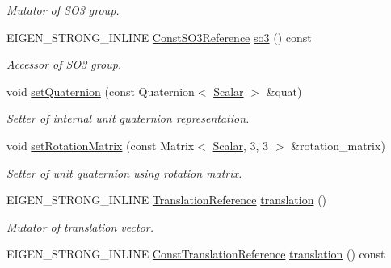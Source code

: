 \begin{DoxyCompactItemize}
\begin{DoxyCompactList}\small\item\em Mutator of S\+O3 group. \end{DoxyCompactList}\item 
E\+I\+G\+E\+N\+\_\+\+S\+T\+R\+O\+N\+G\+\_\+\+I\+N\+L\+I\+NE \hyperlink{class_sophus_1_1_s_e3_group_base_ad2e613f34fbfff912b6b0ccf1fb5f987}{Const\+S\+O3\+Reference} \hyperlink{class_sophus_1_1_s_e3_group_base_a04ef4ad388a72dbbbd97bb6fa893d468}{so3} () const \hypertarget{class_sophus_1_1_s_e3_group_base_a04ef4ad388a72dbbbd97bb6fa893d468}{}\label{class_sophus_1_1_s_e3_group_base_a04ef4ad388a72dbbbd97bb6fa893d468}

\begin{DoxyCompactList}\small\item\em Accessor of S\+O3 group. \end{DoxyCompactList}\item 
void \hyperlink{class_sophus_1_1_s_e3_group_base_a20989a37e6346b012f16ff545d808751}{set\+Quaternion} (const Quaternion$<$ \hyperlink{class_sophus_1_1_s_e3_group_base_aa3db86a2cabe32d3c299dda41af181cc}{Scalar} $>$ \&quat)
\begin{DoxyCompactList}\small\item\em Setter of internal unit quaternion representation. \end{DoxyCompactList}\item 
void \hyperlink{class_sophus_1_1_s_e3_group_base_a8cd9978eb14b416efd6cbb6664900d4d}{set\+Rotation\+Matrix} (const Matrix$<$ \hyperlink{class_sophus_1_1_s_e3_group_base_aa3db86a2cabe32d3c299dda41af181cc}{Scalar}, 3, 3 $>$ \&rotation\+\_\+matrix)
\begin{DoxyCompactList}\small\item\em Setter of unit quaternion using rotation matrix. \end{DoxyCompactList}\item 
E\+I\+G\+E\+N\+\_\+\+S\+T\+R\+O\+N\+G\+\_\+\+I\+N\+L\+I\+NE \hyperlink{class_sophus_1_1_s_e3_group_base_a132e7fc1322c47cedd1f1bbed592e64e}{Translation\+Reference} \hyperlink{class_sophus_1_1_s_e3_group_base_a0b51bdc366409559d527d6af0e244091}{translation} ()\hypertarget{class_sophus_1_1_s_e3_group_base_a0b51bdc366409559d527d6af0e244091}{}\label{class_sophus_1_1_s_e3_group_base_a0b51bdc366409559d527d6af0e244091}

\begin{DoxyCompactList}\small\item\em Mutator of translation vector. \end{DoxyCompactList}\item 
E\+I\+G\+E\+N\+\_\+\+S\+T\+R\+O\+N\+G\+\_\+\+I\+N\+L\+I\+NE \hyperlink{class_sophus_1_1_s_e3_group_base_a0244af65402395137db21fe8ce013097}{Const\+Translation\+Reference} \hyperlink{class_sophus_1_1_s_e3_group_base_ab55db679a6b48a53e1d35773bbf1679b}{translation} () const \hypertarget{class_sophus_1_1_s_e3_group_base_ab55db679a6b48a53e1d35773bbf1679b}{}\label{class_sophus_1_1_s_e3_group_base_ab55db679a6b48a53e1d35773bbf1679b}


\end{DoxyCompactItemize}
